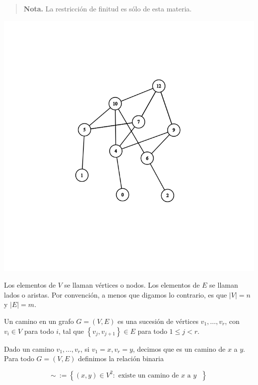 \documentclass[a4paper]{article}
\begin{document}
\small
\begin{quote}

\textbf{Nota.} La restricción de finitud es sólo de esta materia. 

\end{quote}
\normalsize

\begin{center}
\includegraphics[scale=0.5]{graph}
\end{center}

Los elementos de $V$ se llaman vértices o nodos. Los elementos de $E$ se llaman
lados o aristas. Por convención, a menos que digamos lo contrario, es que $|V| =
n$ y $|E| = m$.

\begin{definition}
    Un camino en un grafo $G = (V, E) $ es una sucesión de vértices $v_1,
    \ldots, v_r$, con $ v_i \in V$ para todo $i$, tal que $\left\{ v_j, v_{j+1}
    \right\} \in E $ para todo $1 \leq j < r$. 
\end{definition}


Dado un camino $v_1, \ldots, v_r$, si $v_1 = x, v_r = y$, decimos que es un
camino de $x$ a $y$. Para todo $G = (V, E)$ definimos la relación binaria 

$$\sim ~:=\left\{ (x, y) \in V^2 : \text{ existe un camino de $x$ a $y$ }  \right\} $$
\end{document}
